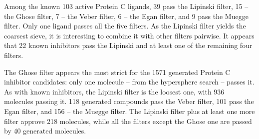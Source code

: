 \documentclass[12pt]{article}
\begin{document}
Among the known 103 active Protein C ligands, 
39 pass the Lipinski filter, 
15 -- the Ghose filter,
7 -- the Veber filter,
6 -- the Egan filter,
and 9 pass the Muegge filter. 
Only one ligand passes all the five filters.
As the Lipinski filter yields the coarsest sieve, it is interesting to combine it with other filters pairwise.
It appears that 22 known inhibitors pass the Lipinski and at least one of the remaining four filters.

The Ghose filter appears the most strict for the 1571 generated Protein C inhibitor candidates: only one molecule -- from the hypersphere search -- passes it.
As with known inhibitors, the Lipinski filter is the loosest one, with 936 molecules passing it. 
118 generated compounds pass the Veber filter, 101 pass the Egan filter, and 156 -- the Muegge filter.
The Lipinski filter plus at least one more filter approve 218 molecules, while all the filters except the Ghose one are passed by 40 generated molecules.
\end{document}
